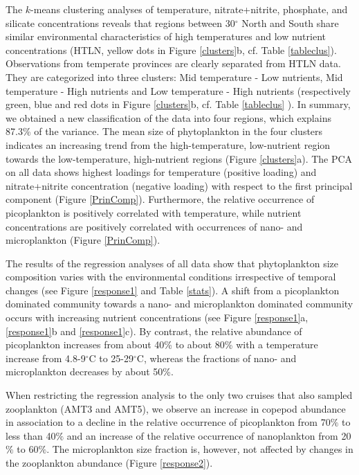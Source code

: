 The $k$-means clustering analyses of temperature, nitrate+nitrite, phosphate, and silicate concentrations reveals that regions between 30$^{\circ}$ North and South share similar environmental characteristics of high temperatures and low nutrient concentrations (HTLN, yellow dots in Figure \ref{clusters}b, cf. Table \ref{tableclus}). Observations from temperate provinces are clearly separated from HTLN data. They are categorized into three clusters: Mid temperature - Low nutrients, Mid temperature - High nutrients and Low temperature - High nutrients (respectively green, blue and red dots in Figure \ref{clusters}b, cf. Table \ref{tableclus} ). In summary, we obtained a new classification of the data into four regions, which explains 87.3\% of the variance. The mean size of phytoplankton in the four clusters indicates an increasing trend from the high-temperature, low-nutrient region towards the low-temperature, high-nutrient regions (Figure \ref{clusters}a). The PCA on all data shows highest loadings for temperature (positive loading) and nitrate+nitrite concentration (negative loading) with respect to the first principal component (Figure \ref{PrinComp}). Furthermore, the relative occurrence of picoplankton is positively correlated with temperature, while nutrient concentrations are positively correlated with occurrences of nano- and microplankton (Figure \ref{PrinComp}).

The results of the regression analyses of all data show that phytoplankton size composition varies with the environmental conditions irrespective of temporal changes (see Figure \ref{response1} and Table \ref{stats}). A shift from a picoplankton dominated community towards a nano- and microplankton dominated community occurs with increasing nutrient concentrations (see Figure \ref{response1}a, \ref{response1}b and \ref{response1}c). By contrast, the relative abundance of picoplankton increases from about 40\% to about 80\% with a temperature increase from 4.8-9$^{\circ}$C to 25-29$^{\circ}$C, whereas the fractions of nano- and microplankton decreases by about 50\%.

When restricting the regression analysis to the only two cruises that also sampled zooplankton (AMT3 and AMT5), we observe an increase in copepod abundance in association to a decline in the relative occurrence of picoplankton from 70$\%$ to less than 40$\%$ and an increase of the relative occurrence of nanoplankton from 20$\%$ to 60$\%$. The microplankton size fraction is, however, not affected by changes in the zooplankton abundance (Figure \ref{response2}).

